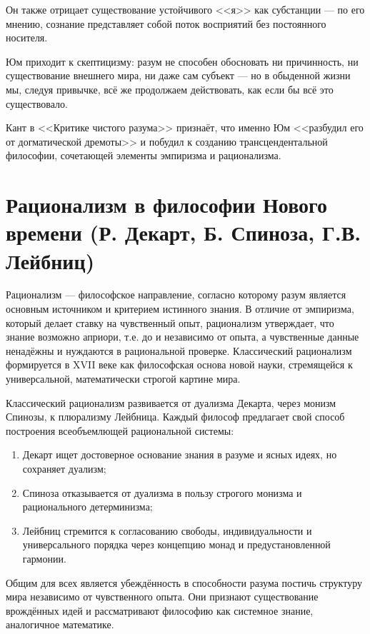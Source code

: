 \documentclass[12pt,a4paper]{article}
\begin{document}
	Он также отрицает существование устойчивого <<я>> как субстанции — по его мнению, сознание представляет собой поток восприятий без постоянного носителя.
	
	Юм приходит к скептицизму: разум не способен обосновать ни причинность, ни существование внешнего мира, ни даже сам субъект — но в обыденной жизни мы, следуя привычке, всё же продолжаем действовать, как если бы всё это существовало.
	
	Кант в <<Критике чистого разума>> признаёт, что именно Юм <<разбудил его от догматической дремоты>> и побудил к созданию трансцендентальной философии, сочетающей элементы эмпиризма и рационализма.
	
	\section{Рационализм в философии Нового времени (Р. Декарт, Б. Спиноза, Г.В. Лейбниц)~\checkmark}
	Рационализм — философское направление, согласно которому разум является основным источником и критерием истинного знания. В отличие от эмпиризма, который делает ставку на чувственный опыт, рационализм утверждает, что знание возможно априори, т.е. до и независимо от опыта, а чувственные данные ненадёжны и нуждаются в рациональной проверке. Классический рационализм формируется в XVII веке как философская основа новой науки, стремящейся к универсальной, математически строгой картине мира.
	
	Классический рационализм развивается от дуализма Декарта, через монизм Спинозы, к плюрализму Лейбница. Каждый философ предлагает свой способ построения всеобъемлющей рациональной системы:
	\begin{enumerate}
		\item Декарт ищет достоверное основание знания в разуме и ясных идеях, но сохраняет дуализм;
		
		\item Спиноза отказывается от дуализма в пользу строгого монизма и рационального детерминизма;
		
		\item Лейбниц стремится к согласованию свободы, индивидуальности и универсального порядка через концепцию монад и предустановленной гармонии.
	\end{enumerate}
	
	Общим для всех является убеждённость в способности разума постичь структуру мира независимо от чувственного опыта. Они признают существование врождённых идей и рассматривают философию как системное знание, аналогичное математике.
	
\end{document}
